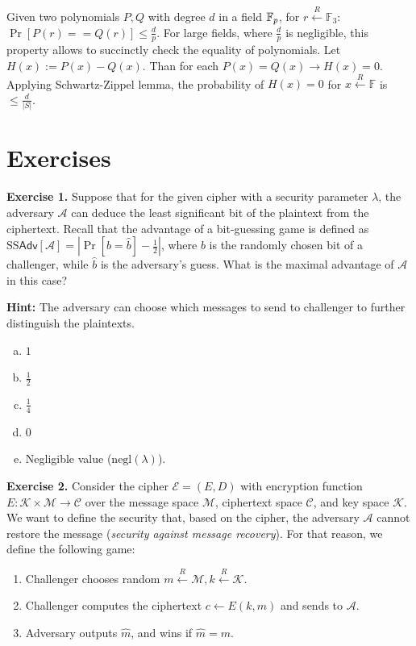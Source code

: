 \documentclass[../lecture-notes.tex]{subfiles}
\begin{document}
Given two polynomials $P, Q$ with  degree $d$ in a field $\mathbb{F}_p$, for $r \xleftarrow{R} \mathbb{F}_3$: $\Pr[P(r) == Q(r)] \le \frac{d}{p}$.
For large fields, where  $\frac{d}{p}$ is negligible, this property allows to succinctly check the equality of polynomials.
Let $H(x) := P(x) - Q(x)$. Than for each $P(x) = Q(x) \rightarrow H(x) = 0$. Applying Schwartz-Zippel lemma, 
the probability of $H(x) = 0$ for $x \xleftarrow{R} \mathbb{F} $ is $\le \frac{d}{|S|}$.

\section{Exercises}

\textbf{Exercise 1.} Suppose that for the given cipher with a security parameter $\lambda$, the adversary $\mathcal{A}$ can deduce the least significant bit of the plaintext from the ciphertext. Recall that the advantage 
of a bit-guessing game is defined as $\text{SS}\mathsf{Adv}[\mathcal{A}] = \left|\Pr[b=\hat{b}] - \frac{1}{2}\right|$, where $b$ is the randomly chosen bit of a challenger, while 
$\hat{b}$ is the adversary's guess. What is the maximal advantage of $\mathcal{A}$ in this case?

\textbf{Hint:} The adversary can choose which messages to send to challenger to further distinguish the plaintexts.

\begin{enumerate}[a)]
    \item $1$
    \item $\frac{1}{2}$
    \item $\frac{1}{4}$
    \item $0$
    \item Negligible value ($\text{negl}(\lambda)$).
\end{enumerate}

\textbf{Exercise 2.} Consider the cipher $\mathcal{E} = (E,D)$ with encryption function $E: \mathcal{K} \times \mathcal{M} \to \mathcal{C}$ over the message space $\mathcal{M}$, ciphertext space $\mathcal{C}$, and key space $\mathcal{K}$. We want to define the security
that, based on the cipher, the adversary $\mathcal{A}$ cannot restore the message (\textit{security against message recovery}). For that reason, we define the following game:
\begin{enumerate}
    \item Challenger chooses random $m \xleftarrow{R} \mathcal{M}, k \xleftarrow{R} \mathcal{K}$.
    \item Challenger computes the ciphertext $c \gets E(k,m)$ and sends to $\mathcal{A}$.
    \item Adversary outputs $\hat{m}$, and wins if $\hat{m} = m$.
\end{enumerate}
\end{document}
